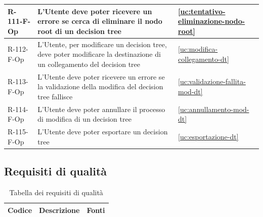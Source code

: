 ﻿\documentclass[a4paper,12pt]{article}
\begin{document}
{{\begin{longtable}{|l|p{}|p{}|}
            R-111-F-Op      & L'Utente deve poter ricevere un errore se cerca di eliminare il nodo root di un decision tree                                                                                               & \ref{uc:tentativo-eliminazione-nodo-root}                                               \\ \hline
            R-112-F-Op      & L'Utente, per modificare un decision tree, deve poter modificare la destinazione di un collegamento del decision tree                                                                       & \ref{uc:modifica-collegamento-dt}                                               \\ \hline
            R-113-F-Op      & L'Utente deve poter ricevere un errore se la validazione della modifica del decision tree fallisce                                                                                          & \ref{uc:validazione-fallita-mod-dt}                                               \\ \hline
            R-114-F-Op      & L'Utente deve poter annullare il processo di modifica di un decision tree                                                                                                                   & \ref{uc:annullamento-mod-dt}                                               \\ \hline
            R-115-F-Op      & L'Utente deve poter esportare un decision tree                                                                                                                                              & \ref{uc:esportazione-dt}                                               \\ \hline
        \end{longtable}
    }

    \newpage

    \subsection{Requisiti di qualità}{

        \begin{longtable}{|l|p{}|p{7.5cm}|}
            \caption{Tabella dei requisiti di qualità}
            \label{tab:requisiti-qualità}                                                                                                                                                                                                                                                       \\
            \hline
            \rowcolor{gold}
            \textbf{Codice} & \textbf{Descrizione}                                                                                                                          & \textbf{Fonti}                                                                                                    \\
            \hline
            \endfirsthead


\end{longtable}}}
\end{document}
